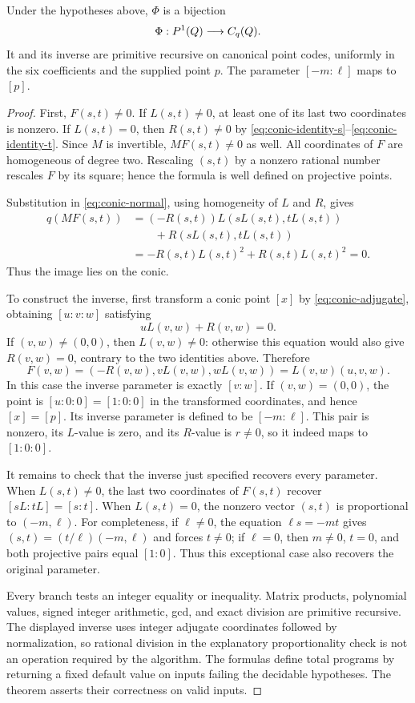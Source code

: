 \begin{theorem}
\label{thm:conic-param}
Under the hypotheses above, $\Phi$ is a bijection
\[
 \Phi:P^1(Q)\longrightarrow C_q(Q).
\]
It and its inverse are primitive recursive on canonical point codes,
uniformly in the six coefficients and the supplied point $p$.
The parameter $[-m:\ell]$ maps to $[p]$.
\end{theorem}

\begin{proof}
First, $F(s,t)\ne0$.  If $L(s,t)\ne0$, at least one of its last two
coordinates is nonzero.  If $L(s,t)=0$, then $R(s,t)\ne0$ by
\eqref{eq:conic-identity-s}--\eqref{eq:conic-identity-t}.
Since $M$ is invertible, $MF(s,t)\ne0$ as well.  All coordinates of $F$
are homogeneous of degree two.  Rescaling $(s,t)$ by a nonzero rational
number rescales $F$ by its square; hence the formula is well defined
on projective points.

Substitution in \eqref{eq:conic-normal}, using homogeneity of $L$ and
$R$, gives
\[
\begin{aligned}
 q(MF(s,t))&=(-R(s,t))L(sL(s,t),tL(s,t))\\
           &\qquad+R(sL(s,t),tL(s,t))\\
           &=-R(s,t)L(s,t)^2+R(s,t)L(s,t)^2=0.
\end{aligned}
\]
Thus the image lies on the conic.

To construct the inverse, first transform a conic point $[x]$ by
\eqref{eq:conic-adjugate}, obtaining $[u:v:w]$ satisfying
\[
 uL(v,w)+R(v,w)=0.
\]
If $(v,w)\ne(0,0)$, then $L(v,w)\ne0$: otherwise this equation would
also give $R(v,w)=0$, contrary to the two identities above.  Therefore
\[
 F(v,w)=(-R(v,w),vL(v,w),wL(v,w))
       =L(v,w)(u,v,w).
\]
In this case the inverse parameter is exactly $[v:w]$.
If $(v,w)=(0,0)$, the point is $[u:0:0]=[1:0:0]$ in the transformed
coordinates, and hence $[x]=[p]$.  Its inverse parameter is defined to
be $[-m:\ell]$.  This pair is nonzero, its $L$-value is zero, and its
$R$-value is $r\ne0$, so it indeed maps to $[1:0:0]$.

It remains to check that the inverse just specified recovers every
parameter.  When $L(s,t)\ne0$, the last two coordinates of $F(s,t)$
recover $[sL:tL]=[s:t]$.  When $L(s,t)=0$, the nonzero vector $(s,t)$
is proportional to $(-m,\ell)$.  For completeness, if $\ell\ne0$,
the equation $\ell s=-mt$ gives
$(s,t)=(t/\ell)(-m,\ell)$ and forces $t\ne0$; if $\ell=0$, then
$m\ne0$, $t=0$, and both projective pairs equal $[1:0]$.
Thus this exceptional case also recovers the original parameter.

Every branch tests an integer equality or inequality.  Matrix products,
polynomial values, signed integer arithmetic, gcd, and exact division
are primitive recursive.  The displayed inverse uses integer adjugate
coordinates followed by normalization, so rational division in the
explanatory proportionality check is not an operation required by the
algorithm.  The formulas define total programs by returning a fixed
default value on inputs failing the decidable hypotheses.  The theorem
asserts their correctness on valid inputs.
\end{proof}

